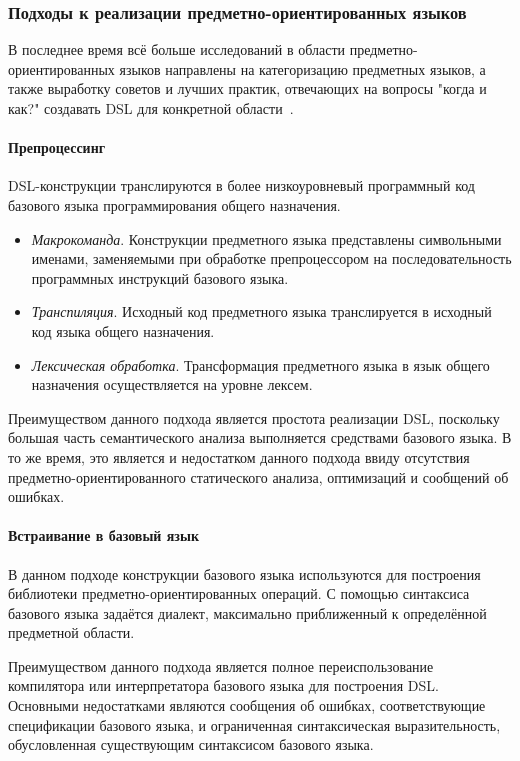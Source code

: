 \subsubsection{Подходы к реализации предметно-ориентированных языков}
В последнее время всё больше исследований в области
предметно-ориен\-тированных языков направлены на категоризацию предметных
языков, а также выработку советов и лучших практик, отвечающих на вопросы
"когда и как?" создавать DSL для конкретной области~\cite{when-and-how-develop-dsl,study-on-preliminary-approaches-develop-dsl,spinellis-dsl-patterns}.
\paragraph{Препроцессинг}
DSL-конструкции транслируются в более низкоуровневый программный код
базового языка программирования общего назначения.
\begin{itemize}
	\item \textit{Макрокоманда}. Конструкции предметного языка представлены
	символьными именами, заменяемыми при обработке препроцессором на
	последовательность программных инструкций базового языка.
	\item \textit{Транспиляция}. Исходный код предметного языка
	транслируется в исходный код языка общего назначения.
	\item \textit{Лексическая обработка}. Трансформация предметного языка в
	язык общего назначения осуществляется на уровне лексем.
\end{itemize}

Преимуществом данного подхода является простота реализации DSL, поскольку
большая часть семантического анализа выполняется средствами базового языка.
В то же время, это является и недостатком данного подхода ввиду отсутствия
предметно-ориентированного статического анализа, оптимизаций и сообщений об ошибках.

\paragraph{Встраивание в базовый язык}
В данном подходе конструкции базового языка используются для построения
библиотеки предметно-ориен\-тированных операций. С помощью синтаксиса
базового языка задаётся диалект, максимально приближенный к определённой
предметной области.

Преимуществом данного подхода является полное переиспользование компилятора или интерпретатора базового языка для построения DSL. Основными недостатками
являются сообщения об ошибках, соответствующие спецификации базового языка,
и ограниченная синтаксическая выразительность, обусловленная
существующим синтаксисом базового языка.

